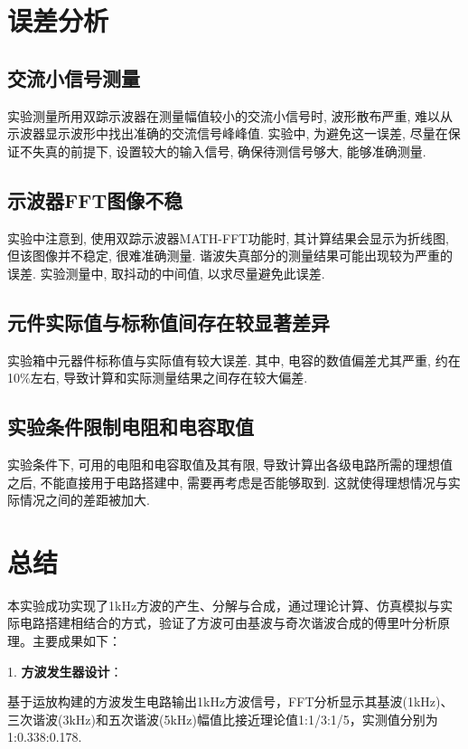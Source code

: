 \documentclass[UTF2]{ctexart}
\begin{document}
	\section{误差分析}
	
	\subsection{交流小信号测量}
	
	实验测量所用双踪示波器在测量幅值较小的交流小信号时, 波形散布严重,  难以从示波器显示波形中找出准确的交流信号峰峰值. 实验中, 为避免这一误差, 尽量在保证不失真的前提下, 设置较大的输入信号, 确保待测信号够大, 能够准确测量.
	
	\subsection{示波器FFT图像不稳}
	
	实验中注意到, 使用双踪示波器MATH-FFT功能时, 其计算结果会显示为折线图, 但该图像并不稳定, 很难准确测量. 谐波失真部分的测量结果可能出现较为严重的误差. 实验测量中, 取抖动的中间值, 以求尽量避免此误差.
	
	\subsection{元件实际值与标称值间存在较显著差异}
	
	实验箱中元器件标称值与实际值有较大误差. 其中, 电容的数值偏差尤其严重, 约在10\%左右, 导致计算和实际测量结果之间存在较大偏差.
	
	\subsection{实验条件限制电阻和电容取值}
	
	实验条件下, 可用的电阻和电容取值及其有限, 导致计算出各级电路所需的理想值之后, 不能直接用于电路搭建中, 需要再考虑是否能够取到. 这就使得理想情况与实际情况之间的差距被加大.
	
	\section{总结}
	
	本实验成功实现了1kHz方波的产生、分解与合成，通过理论计算、仿真模拟与实际电路搭建相结合的方式，验证了方波可由基波与奇次谐波合成的傅里叶分析原理。主要成果如下：
	
	1. \textbf{方波发生器设计}：
	
	基于运放构建的方波发生电路输出1kHz方波信号，FFT分析显示其基波(1kHz)、三次谐波(3kHz)和五次谐波(5kHz)幅值比接近理论值1:1/3:1/5，实测值分别为1:0.338:0.178.
	
\end{document}
